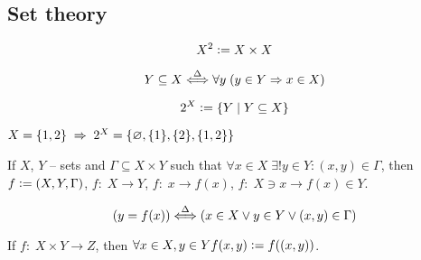 \subsection{Set theory}
\begin{equation}
    X^2 \vcentcolon= X \times X
\end{equation}

\begin{equation}
    Y \subseteq X \stackrel{\Delta}{\Longleftrightarrow} \forall y \; (y \in Y \Rightarrow x \in X)
\end{equation}

\begin{equation}
    2^{X} \vcentcolon= \{ Y \;\vert\; Y \subseteq X \}
\end{equation}

\begin{example} $ X = \{1, 2\} \thus 2^X = \{\emptyset, \{1\}, \{2\}, \{1, 2\}\} $ \end{example}


\begin{definition}
If $X$, $Y$ -- sets and $\Gamma \subseteq X \times Y$ such that $\forall x \in X \; \exists! y \in Y : (x, y) \in \Gamma$, then $f \vcentcolon= (X, Y, \Gamma)$, $f{:}\; X \rightarrow Y$, $f{:}\; x \rightarrow f(x)$, $f{:}\; X \ni x \rightarrow f(x) \in Y$.

\[ (y = f(x)) \stackrel{\Delta}{\Longleftrightarrow} (x \in X \lor y \in Y \lor (x, y) \in \Gamma) \]
\end{definition}

If $f{:}\; X \times Y \rightarrow Z$, then $\forall x \in X, y \in Y f(x, y) \vcentcolon= f((x, y))$.


